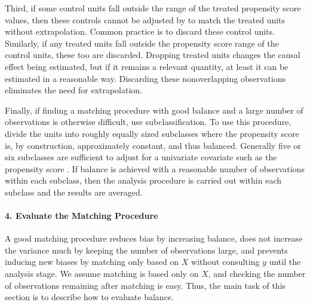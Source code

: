 \documentclass[11pt,titlepage]{article}
\begin{document}
Third, if some control units fall outside the range of the treated
propensity score values, then these controls cannot be adjusted by to
match the treated units without extrapolation.  Common practice is to
discard these control units.  Similarly, if any treated units fall
outside the propensity score range of the control units, these too are
discarded.  Dropping treated units changes the causal effect being
estimated, but if it remains a relevant quantity, at least it can be
estimated in a reasonable way.  Discarding these nonoverlapping
observations eliminates the need for extrapolation.

Finally, if finding a matching procedure with good balance and a large
number of observations is otherwise difficult, use subclassification.
To use this procedure, divide the units into roughly equally sized
subclasses where the propensity score is, by construction,
approximately constant, and thus balanced.  Generally five or six
subclasses are sufficient to adjust for a univariate covariate such as
the propensity score \citep{Cochran68,RosRub84}.  If balance is
achieved with a reasonable number of observations within each
subclass, then the analysis procedure is carried out within each
subclass and the results are averaged.

\paragraph{4. Evaluate the Matching Procedure}
A good matching procedure reduces bias by increasing balance, does not
increase the variance much by keeping the number of observations
large, and prevents inducing new biases by matching only based on $X$
without consulting $y$ until the analysis stage.  We assume matching
is based only on $X$, and checking the number of observations
remaining after matching is easy.  Thus, the main task of this section
is to describe how to evaluate balance.
\end{document}
